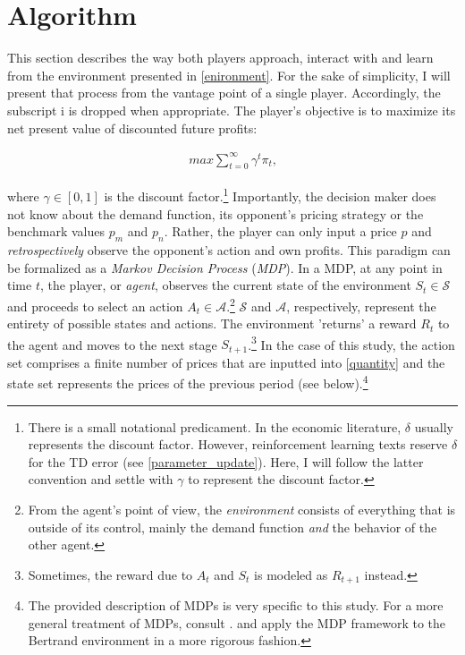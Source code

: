 \section{Algorithm}\label{algorithm}

This section describes the way both players approach, interact with and learn from the environment presented in \autoref{enironment}. For the sake of simplicity, I will present that process from the vantage point of a single player. Accordingly, the subscript {i} is dropped when appropriate. The player's objective is to maximize its net present value of discounted future profits:

\begin{gather}\label{maximization}
max \sum_{t = 0}^{\infty} \gamma^t \pi_{t} \text{,}
\end{gather}

where $\gamma \in [0, 1]$ is the discount factor.\footnote{There is a small notational predicament. In the economic literature, $\delta$ usually represents the discount factor. However, reinforcement learning texts reserve $\delta$ for the TD error (see \autoref{parameter_update}). Here, I will follow the latter convention and settle with $\gamma$ to represent the discount factor.} Importantly, the decision maker does not know about the demand function, its opponent's pricing strategy or the benchmark values $p_m$ and $p_n$. Rather, the player can only input a price $p$ and \emph{retrospectively} observe the opponent's action and own profits. This paradigm can be formalized as a \emph{Markov Decision Process} (\emph{MDP}). In a MDP, at any point in time $t$, the player, or \emph{agent}, observes the current state of the environment $S_t \in \mathcal{S}$ and proceeds to select an action $A_t \in \mathcal{A}$.\footnote{From the agent's point of view, the \emph{environment} consists of everything that is outside of its control, mainly the demand function \emph{and} the behavior of the other agent.} $\mathcal{S}$ and $\mathcal{A}$, respectively, represent the entirety of possible states and actions. The environment 'returns' a reward $R_t$ to the agent and moves to the next stage $S_{t+1}$.\footnote{Sometimes, the reward due to $A_t$ and $S_t$ is modeled as $R_{t+1}$ instead.} In the case of this study, the action set comprises a finite number of prices  that are inputted into \autoref{quantity} and the state set represents the prices of the previous period (see below).\footnote{The provided description of MDPs is very specific to this study. For a more general treatment of MDPs, consult \textcite{sutton_reinforcement_2018}. \textcite{calvano_algorithmic_2018} and \textcite{hettich} apply the MDP framework to the Bertrand environment in a more rigorous fashion.}

